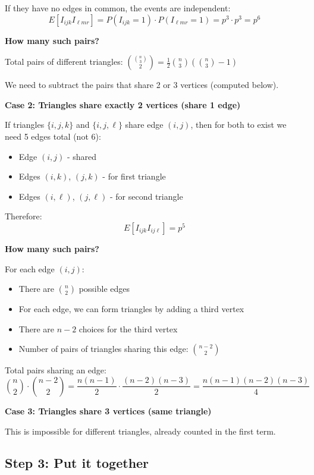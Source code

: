 \documentclass[11pt]{article}
\begin{document}
If they have no edges in common, the events are independent:
\[
E[I_{ijk} I_{\ell mr}] = P(I_{ijk} = 1) \cdot P(I_{\ell mr} = 1) = p^3 \cdot p^3 = p^6
\]

\textbf{How many such pairs?}

Total pairs of different triangles: $\binom{\binom{n}{3}}{2} = \frac{1}{2}\binom{n}{3}\left(\binom{n}{3} - 1\right)$

We need to subtract the pairs that share 2 or 3 vertices (computed below).

\vspace{0.5em}

\textbf{Case 2: Triangles share exactly 2 vertices (share 1 edge)}

If triangles $\{i,j,k\}$ and $\{i,j,\ell\}$ share edge $(i,j)$, then for both to exist we need 5 edges total (not 6):
\begin{itemize}[leftmargin=2em]
    \item Edge $(i,j)$ - shared
    \item Edges $(i,k)$, $(j,k)$ - for first triangle
    \item Edges $(i,\ell)$, $(j,\ell)$ - for second triangle
\end{itemize}

Therefore:
\[
E[I_{ijk} I_{ij\ell}] = p^5
\]

\textbf{How many such pairs?}

For each edge $(i,j)$:
\begin{itemize}[leftmargin=2em]
    \item There are $\binom{n}{2}$ possible edges
    \item For each edge, we can form triangles by adding a third vertex
    \item There are $n-2$ choices for the third vertex
    \item Number of pairs of triangles sharing this edge: $\binom{n-2}{2}$
\end{itemize}

Total pairs sharing an edge:
\[
\binom{n}{2} \cdot \binom{n-2}{2} = \frac{n(n-1)}{2} \cdot \frac{(n-2)(n-3)}{2} = \frac{n(n-1)(n-2)(n-3)}{4}
\]

\vspace{0.5em}

\textbf{Case 3: Triangles share 3 vertices (same triangle)}

This is impossible for different triangles, already counted in the first term.

\subsection*{Step 3: Put it together}
\end{document}
